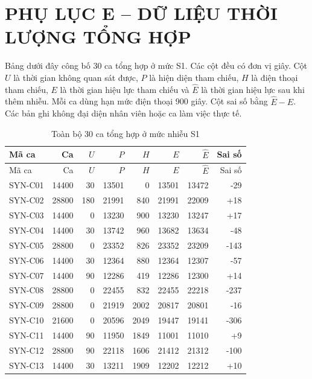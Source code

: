 \clearpage
\section*{PHỤ LỤC E -- DỮ LIỆU THỜI LƯỢNG TỔNG HỢP}
Bảng dưới đây công bố 30 ca tổng hợp ở mức S1. Các cột đều có đơn vị giây. Cột $U$ là thời gian không quan sát được, $P$ là hiện diện tham chiếu, $H$ là điện thoại tham chiếu, $E$ là thời gian hiệu lực tham chiếu và $\widehat{E}$ là thời gian hiệu lực sau khi thêm nhiễu. Mỗi ca dùng hạn mức điện thoại 900 giây. Cột sai số bằng $\widehat{E}-E$. Các bản ghi không đại diện nhân viên hoặc ca làm việc thực tế.

\begingroup
\small
\renewcommand{\arraystretch}{0.9}
\setlength{\tabcolsep}{4pt}
\begin{longtable}{lrrrrrrr}
\caption{Toàn bộ 30 ca tổng hợp ở mức nhiễu S1}\label{tab:synthetic-all-shifts}\\
\toprule
Mã ca & Ca & $U$ & $P$ & $H$ & $E$ & $\widehat{E}$ & Sai số\\
\midrule\endfirsthead
\toprule
Mã ca & Ca & $U$ & $P$ & $H$ & $E$ & $\widehat{E}$ & Sai số\\
\midrule\endhead
\bottomrule\endfoot
SYN-C01 & 14400 & 30 & 13501 & 0 & 13501 & 13472 & -29\\
SYN-C02 & 28800 & 180 & 21991 & 840 & 21991 & 22009 & +18\\
SYN-C03 & 14400 & 0 & 13230 & 900 & 13230 & 13247 & +17\\
SYN-C04 & 14400 & 30 & 13742 & 960 & 13682 & 13634 & -48\\
SYN-C05 & 28800 & 0 & 23352 & 826 & 23352 & 23209 & -143\\
SYN-C06 & 14400 & 30 & 12364 & 880 & 12364 & 12307 & -57\\
SYN-C07 & 14400 & 90 & 12286 & 419 & 12286 & 12300 & +14\\
SYN-C08 & 28800 & 0 & 22455 & 832 & 22455 & 22218 & -237\\
SYN-C09 & 28800 & 0 & 21919 & 2002 & 20817 & 20801 & -16\\
SYN-C10 & 21600 & 0 & 20596 & 2049 & 19447 & 19141 & -306\\
SYN-C11 & 14400 & 90 & 11950 & 1849 & 11001 & 11010 & +9\\
SYN-C12 & 28800 & 90 & 22118 & 1606 & 21412 & 21312 & -100\\
SYN-C13 & 14400 & 30 & 13211 & 1909 & 12202 & 12212 & +10\\

\end{longtable}
